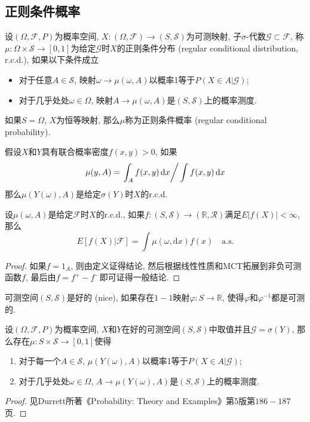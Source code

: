 \documentclass[cn, 12pt, math=mtpro2, bibstyle=apa, blue, twocol]{elegantbook}
\newcommand{\F}{\mathcal{F}}
\newcommand{\R}{\mathbb{R}}
\newcommand{\SE}{\mathcal{S}}
\newcommand{\G}{\mathcal{G}}
\begin{document}
\subsection{正则条件概率}
\begin{definition}
设$(\Omega,\F,P)$为概率空间, $X:(\Omega,\F)\to (S,\SE)$为可测映射, 子$\sigma$-代数$\G\subset\F$, 称$\mu:\Omega\times \SE\to [0,1]$为给定$\G$时$X$的正则条件分布 (regular conditional distribution, r.c.d.), 如果以下条件成立
\begin{itemize}
  \item 对于任意$A\in \SE$, 映射$\omega\to \mu(\omega,A)$以概率1等于$P(X\in A|\G)$;
  \item 对于几乎处处$\omega\in\Omega$, 映射$A\to\mu(\omega,A)$是$(S,\SE)$上的概率测度.
\end{itemize}
如果$S=\Omega$, $X$为恒等映射, 那么$\mu$称为正则条件概率 (regular conditional probability).
\end{definition}
\begin{example}
假设$X$和$Y$具有联合概率密度$f(x,y)>0$, 如果
$$\mu(y,A)=\left.\int_Af(x,y)\,\text{d}x\right/\int f(x,y)\,\text{d}x$$
那么$\mu(Y(\omega),A)$是给定$\sigma(Y)$时$X$的r.c.d.
\end{example}
\begin{theorem}
  设$\mu(\omega,A)$是给定$\F$时$X$的r.c.d., 如果$f:(S,\SE)\to (\R,\mathcal{R})$满足$E|f(X)|<\infty$, 那么
  $$E[f(X)|\F]=\int\mu(\omega,\text{d}x)f(x)\quad \text{a.s.}$$
\end{theorem}
\begin{proof}
  如果$f=1_A$, 则由定义证得结论, 然后根据线性性质和MCT拓展到非负可测函数$f$, 最后由$f=f^+-f^-$即可证得一般结论.
\end{proof}

\begin{definition}
可测空间$(S,\SE)$是好的 (nice), 如果存在$1-1$映射$\varphi: S\to \R$, 使得$\varphi$和$\varphi^{-1}$都是可测的.
\end{definition}
\begin{theorem}
  设$(\Omega,\F,P)$为概率空间, $X$和$Y$在好的可测空间$(S,\SE)$中取值并且$\G=\sigma(Y)$, 那么存在$\mu:S\times \SE\to[0,1]$使得
  \begin{enumerate}[label=(\arabic*)]
  \item 对于每一个$A\in\SE$, $\mu(Y(\omega),A)$以概率1等于$P(X\in A|\G)$;
  \item 对于几乎处处$\omega\in \Omega$, $A\to\mu(Y(\omega),A)$是$(S,\SE)$上的概率测度.
  \end{enumerate}
\end{theorem}
\begin{proof}
  见Durrett所著《Probability: Theory and Examples》第5版第$186-187$页.
\end{proof}
\end{document}
